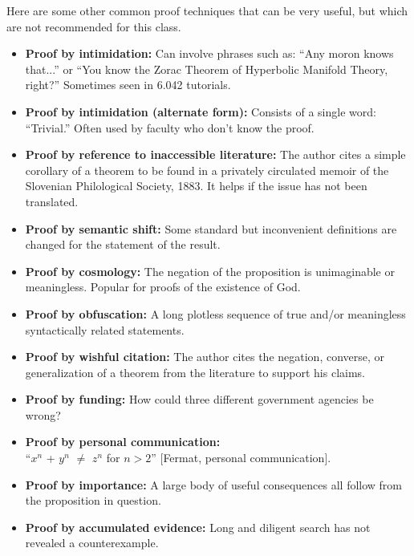 \documentclass[twoside,12pt]{article}
\begin{document}
\newpage

Here are some other common proof techniques that can be very useful,
but which are not recommended for this class.

\begin{itemize}

\item{\bf Proof by intimidation:} Can involve phrases such
as: ``Any moron knows that...'' or ``You know the Zorac Theorem of
Hyperbolic Manifold Theory, right?''  Sometimes seen in 6.042
tutorials.

\item{\bf Proof by intimidation (alternate form):} Consists
of a single word: ``Trivial.''  Often used by faculty who don't know
the proof.

\item {\bf Proof by reference to inaccessible literature:}
The author cites a simple corollary of a theorem to be found in a
privately circulated memoir of the Slovenian Philological Society,
1883.  It helps if the issue has not been translated.\item
{\bf Proof by semantic shift:} Some standard but inconvenient
definitions are changed for the statement of the result.

\item {\bf Proof by cosmology:} The negation of the
proposition is unimaginable or meaningless.  Popular for proofs of the
existence of God.

\item {\bf Proof by obfuscation:} A long plotless sequence of
true and/or meaningless syntactically related statements.

\item {\bf Proof by wishful citation:} The author cites the
negation, converse, or generalization of a theorem from the literature
to support his claims.

\item {\bf Proof by funding:} How could three different government
agencies be wrong?

\item {\bf Proof by personal communication:}\\ ``$x^n$ + $y^n$ $\neq$
$z^n$ for $n>2$'' [Fermat, personal communication].

\item {\bf Proof by importance:} A large body of useful consequences
all follow from the proposition in question.

\item {\bf Proof by accumulated evidence:} Long and diligent search
has not revealed a counterexample.


\end{itemize}
\end{document}
